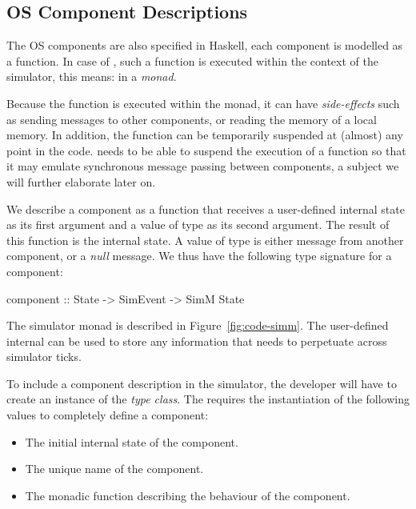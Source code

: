 \subsection{OS Component Descriptions}

The OS components are also specified in Haskell, each component is
modelled as a function. In case of \soosim, such a function is
executed within the context of the simulator, this means: in a
\emph{monad}.

Because the function is executed within the monad, it can have
\emph{side-effects} such as sending messages to other components, or
reading the memory of a local memory.  In addition, the function can
be temporarily suspended at (almost) any point in the code.  \soosim
needs to be able to suspend the execution of a function so that it may
emulate synchronous message passing between components, a subject we
will further elaborate later on.

We describe a component as a function that receives a user-defined
internal state as its first argument and a value of type 
as its second argument.  The result of this function is the internal
state.  A value of type  is either message from another
component, or a \emph{null} message.  We thus have the following type
signature for a component: 
\begin{code}
component :: State -> SimEvent -> SimM State
\end{code}

The simulator monad  is described in
Figure~\ref{fig:code-simm}.   The user-defined internal  can be used to store
any information that needs to perpetuate across simulator ticks.

To include a component description in the simulator, the developer
will have to create an instance of the  \emph{type class}.
The  requires the instantiation of the following values to completely define a component:

\begin{itemize}
  \item The initial internal state of the component.
  \item The unique name of the component.
  \item The monadic function describing the behaviour of the component.
\end{itemize}

